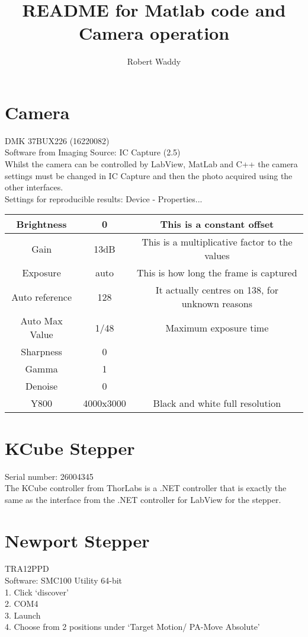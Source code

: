 \documentclass[]{report}
\title{README for Matlab code and Camera operation}
\author{Robert Waddy}
\begin{document}
\maketitle

\section*{Camera}
DMK 37BUX226 (16220082)\\

Software from Imaging Source: IC Capture (2.5)\\
Whilst the camera can be controlled by LabView, MatLab and C++ the camera settings must be changed in IC Capture and then the photo acquired using the other interfaces.\\ 

Settings for reproducible results: Device - Properties...\\

\begin{tabular}{ccc}
	\hline
	Brightness & 0 & This is a constant offset \\
	\hline
	Gain & 13dB & This is a multiplicative factor to the values \\
	\hline
	Exposure & auto & This is how long the frame is captured \\
	\hline
	Auto reference & 128 & It actually centres on 138, for unknown reasons \\
	\hline
	Auto Max Value & 1/48 & Maximum exposure time \\
	\hline
	Sharpness & 0 &  \\
	\hline
	Gamma & 1 &  \\
	\hline
	Denoise & 0 &  \\
	\hline
	Y800 & 4000x3000 & Black and white full resolution \\
	\hline
\end{tabular}

\section*{KCube Stepper}
Serial number: 26004345\\
The KCube controller from ThorLabs is a .NET controller that is exactly the same as the interface from the .NET controller for LabView for the stepper.

\section*{Newport Stepper}
TRA12PPD\\
Software: SMC100 Utility 64-bit\\
1. Click `discover'\\
2. COM4\\
3.  Launch\\
4. Choose from 2 positions under `Target Motion/ PA-Move Absolute' 
\end{document}
